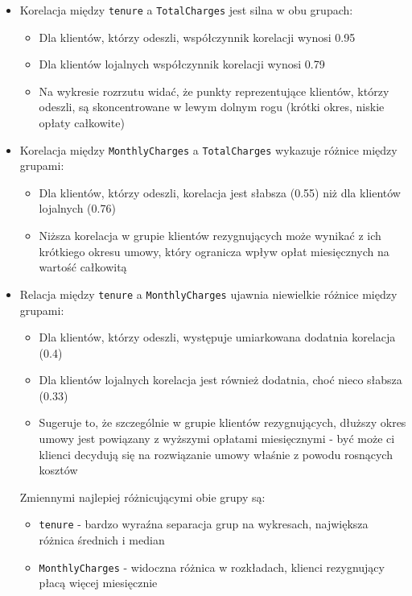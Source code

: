 \documentclass[12pt, a4paper]{article}\usepackage[]{graphicx}\usepackage[]{xcolor}
\begin{document}
\begin{itemize}
  \item Korelacja między \texttt{tenure} a \texttt{TotalCharges} jest silna w obu grupach:
  \begin{itemize}
    \item Dla klientów, którzy odeszli, współczynnik korelacji wynosi 0.95
    \item Dla klientów lojalnych współczynnik korelacji wynosi 0.79
    \item Na wykresie rozrzutu widać, że punkty reprezentujące klientów, którzy odeszli, są skoncentrowane w lewym dolnym rogu (krótki okres, niskie opłaty całkowite)
  \end{itemize}
    
  \item Korelacja między \texttt{MonthlyCharges} a \texttt{TotalCharges} wykazuje różnice między grupami:
  \begin{itemize}
    \item Dla klientów, którzy odeszli, korelacja jest słabsza (0.55) niż dla klientów lojalnych (0.76)
    \item Niższa korelacja w grupie klientów rezygnujących może wynikać z ich krótkiego okresu umowy, który ogranicza wpływ opłat miesięcznych na wartość całkowitą
  \end{itemize}
    
  \item Relacja między \texttt{tenure} a \texttt{MonthlyCharges} ujawnia niewielkie różnice między grupami:
  \begin{itemize}
    \item Dla klientów, którzy odeszli, występuje umiarkowana dodatnia korelacja (0.4)
    \item Dla klientów lojalnych korelacja jest również dodatnia, choć nieco słabsza (0.33)
    \item Sugeruje to, że szczególnie w grupie klientów rezygnujących, dłuższy okres umowy jest powiązany z wyższymi opłatami miesięcznymi - być może ci klienci decydują się na rozwiązanie umowy właśnie z powodu rosnących kosztów
  \end{itemize}

Zmiennymi najlepiej różnicującymi obie grupy są:
  \begin{itemize}
    \item \texttt{tenure} - bardzo wyraźna separacja grup na wykresach, największa różnica średnich i median
    \item \texttt{MonthlyCharges} - widoczna różnica w rozkładach, klienci rezygnujący płacą więcej miesięcznie
  \end{itemize}
    
\end{itemize}
\end{document}
